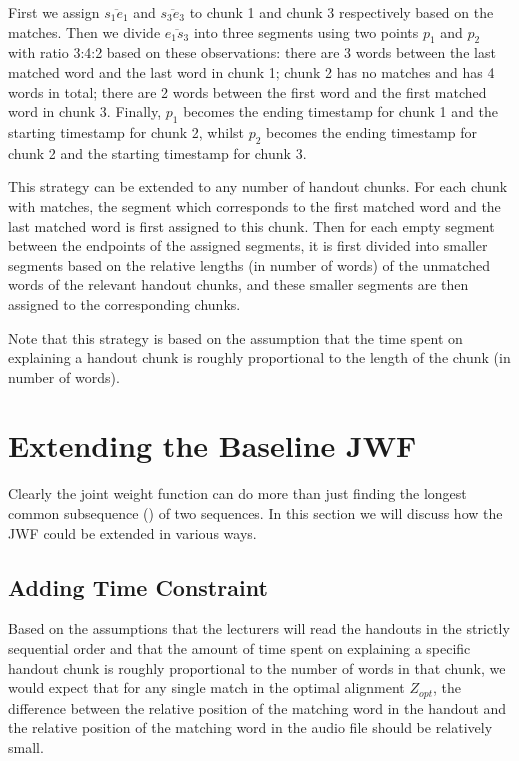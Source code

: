 First we assign $\overline{s_1 e_1}$ and $\overline{s_3 e_3}$ to chunk 1 and chunk 3 respectively based on the matches. Then we divide $\overline{e_1 s_3}$ into three segments using two points $p_1$ and $p_2$ with ratio 3:4:2 based on these observations: there are 3 words between the last matched word and the last word in chunk 1; chunk 2 has no matches and has 4 words in total; there are 2 words between the first word and the first matched word in chunk 3. Finally, $p_1$ becomes the ending timestamp for chunk 1 and the starting timestamp for chunk 2, whilst $p_2$ becomes the ending timestamp for chunk 2 and the starting timestamp for chunk 3.

This strategy can be extended to any number of handout chunks. For each chunk with matches, the segment which corresponds to the first matched word and the last matched word is first assigned to this chunk. Then for each empty segment between the endpoints of the assigned segments, it is first divided into smaller segments based on the relative lengths (in number of words) of the unmatched words of the relevant handout chunks, and these smaller segments are then assigned to the corresponding chunks.

Note that this strategy is based on the assumption that the time spent on explaining a handout chunk is roughly proportional to the length of the chunk (in number of words).


\section{Extending the Baseline JWF}

Clearly the joint weight function can do more than just finding the longest common subsequence () of two sequences. In this section we will discuss how the JWF could be extended in various ways.

\subsection{Adding Time Constraint}
\label{subsec:time-constraint}

Based on the assumptions that the lecturers will read the handouts in the strictly sequential order and that the amount of time spent on explaining a specific handout chunk is roughly proportional to the number of words in that chunk, we would expect that for any single match in the optimal alignment $Z_{opt}$, the difference between the relative position of the matching word in the handout and the relative position of the matching word in the audio file should be relatively small. 

